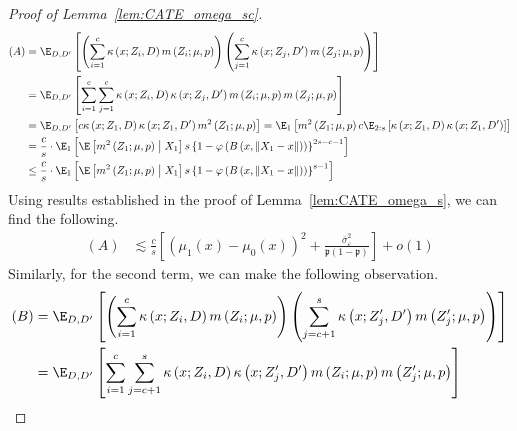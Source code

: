 \begin{proof}[Proof of Lemma~\ref{lem:CATE_omega_sc}]
\begin{equation}
\begin{aligned}
            (A)
            & = \E_{D, D^{\prime}}\left[\left(\sum_{i = 1}^{c} \kappa\left(x; Z_{i}, D\right) m\left(Z_{i}; \mu, p\right)\right)
            \left(\sum_{j = 1}^{c} \kappa\left(x; Z_{j}, D^{\prime}\right) m\left(Z_{j}; \mu, p\right)\right)\right] \\
			& = \E_{D, D^{\prime}}\left[
				\sum_{i = 1}^{c} \sum_{j = 1}^{c} \kappa\left(x; Z_{i}, D\right)\kappa\left(x; Z_{j}, D^{\prime}\right) m\left(Z_{i}; \mu, p\right)m\left(Z_{j}; \mu, p\right)
			\right] \\
			& = \E_{D,D^{\prime}}\left[c \kappa\left(x; Z_{1}, D\right)\kappa\left(x; Z_{1}, D^{\prime}\right)m^{2}\left(Z_{1}; \mu, p\right)\right]
			= \E_{1}\left[m^{2}\left(Z_{1}; \mu, p\right) c \E_{2:s}\left[\kappa\left(x; Z_{1}, D\right)\kappa\left(x; Z_{1}, D^{\prime}\right)\right]\right]\\
			& = \frac{c}{s} \cdot \E_{1}\left[\E\left[m^{2}\left(Z_{1}; \mu, p\right) \; \middle| \; X_1\right] s \left\{1 - \varphi\left(B\left(x, \|X_1 - x\|\right)\right)\right\}^{2s - c- 1}\right]\\
			& \leq \frac{c}{s} \cdot \E_{1}\left[\E\left[m^{2}\left(Z_{1}; \mu, p\right) \; \middle| \; X_1\right] s \left\{1 - \varphi\left(B\left(x, \|X_1 - x\|\right)\right)\right\}^{s - 1}\right]
        \end{aligned}
    \end{equation}
	Using results established in the proof of Lemma~\ref{lem:CATE_omega_s}, we can find the following.
	\begin{equation}
		\begin{aligned}
			(A) 
			& \lesssim \frac{c}{s} \left[\left(\mu_{1}\left(x\right) - \mu_{0}\left(x\right)\right)^2 + \frac{\overline{\sigma}^2_{\varepsilon}}{\mathfrak{p}\left(1 - \mathfrak{p}\right)}\right]  + o(1)
		\end{aligned}
	\end{equation}
	Similarly, for the second term, we can make the following observation.
	\begin{equation}
		\begin{aligned}
			(B) 
			& = \E_{D, D^{\prime}}\left[\left(\sum_{i = 1}^{c} \kappa\left(x; Z_{i}, D\right) m\left(Z_{i}; \mu, p\right)\right)
            \left(\sum_{j = c + 1}^{s} \kappa\left(x; Z_{j}^{\prime}, D^{\prime}\right) m\left(Z_{j}^{\prime}; \mu, p\right)\right)\right] \\
			& = \E_{D,D^{\prime}}\left[\sum_{i = 1}^{c} \sum_{j = c + 1}^{s}\kappa\left(x; Z_{i}, D\right)\kappa\left(x; Z_{j}^{\prime}, D^{\prime}\right) m\left(Z_{i}; \mu, p\right)m\left(Z_{j}^{\prime}; \mu, p\right)\right]\\

\end{aligned}
\end{equation}
\end{proof}
